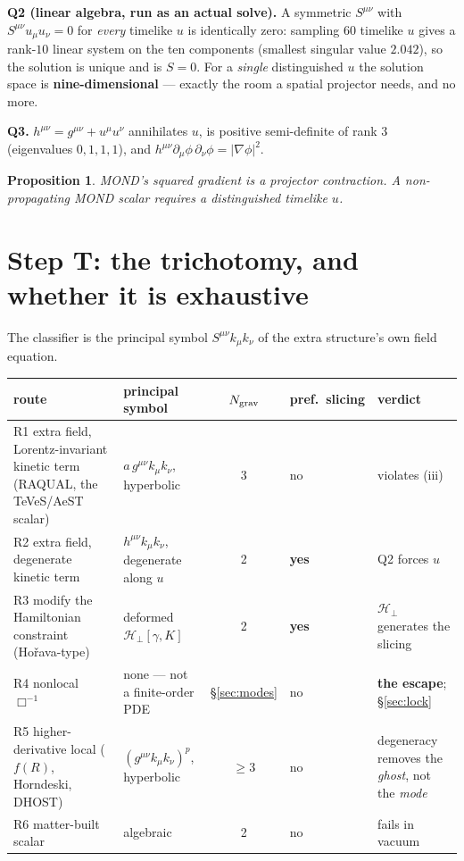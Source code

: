 \documentclass[11pt,letterpaper]{article}
\newtheorem{proposition}{Proposition}
\newcommand{\dal}{\Box}
\begin{document}
\textbf{Q2 (linear algebra, run as an actual solve).} A symmetric $S^{\mu\nu}$ with $S^{\mu\nu}u_\mu u_\nu=0$ for \emph{every} timelike $u$ is identically zero: sampling $60$ timelike $u$ gives a rank-$10$ linear system on the ten components (smallest singular value $2.042$), so the solution is unique and is $S=0$. For a \emph{single} distinguished $u$ the solution space is \textbf{nine-dimensional} --- exactly the room a spatial projector needs, and no more.

\textbf{Q3.} $h^{\mu\nu}=g^{\mu\nu}+u^\mu u^\nu$ annihilates $u$, is positive semi-definite of rank 3 (eigenvalues $0,1,1,1$), and $h^{\mu\nu}\partial_\mu\phi\,\partial_\nu\phi=|\nabla\phi|^2$.

\begin{proposition}
MOND's squared gradient is a projector contraction. A non-propagating MOND scalar requires a distinguished timelike $u$.
\end{proposition}

\section{Step T: the trichotomy, and whether it is exhaustive}\label{sec:T}

The classifier is the principal symbol $S^{\mu\nu}k_\mu k_\nu$ of the extra structure's own field equation.

\begin{center}\small
\begin{tabular}{L{0.27\textwidth}L{0.24\textwidth}cL{0.06\textwidth}L{0.24\textwidth}}\toprule
route & principal symbol & $N_{\rm grav}$ & pref.\ slicing & verdict\\\midrule
R1 extra field, Lorentz-invariant kinetic term (RAQUAL, the TeVeS/AeST scalar) & $a\,g^{\mu\nu}k_\mu k_\nu$, hyperbolic & 3 & no & violates (iii)\\
R2 extra field, degenerate kinetic term & $h^{\mu\nu}k_\mu k_\nu$, degenerate along $u$ & 2 & \textbf{yes} & Q2 forces $u$\\
R3 modify the Hamiltonian constraint (Ho\v{r}ava-type) & deformed $\mathcal{H}_\perp[\gamma,K]$ & 2 & \textbf{yes} & $\mathcal{H}_\perp$ generates the slicing\\
R4 nonlocal $\dal^{-1}$ & none --- not a finite-order PDE & \S\ref{sec:modes} & no & \textbf{the escape}; \S\ref{sec:lock}\\
R5 higher-derivative local ($f(R)$, Horndeski, DHOST) & $(g^{\mu\nu}k_\mu k_\nu)^p$, hyperbolic & $\ge3$ & no & degeneracy removes the \emph{ghost}, not the \emph{mode}\\
R6 matter-built scalar & algebraic & 2 & no & fails in vacuum\\\bottomrule
\end{tabular}
\end{center}
\end{document}

